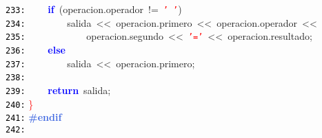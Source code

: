 \documentclass[a4paper,10pt]{scrartcl}
\begin{document}
{   \mbox{}\texttt{\textcolor{Black}{233:}} \ \ \ \ \textbf{\textcolor{Blue}{if}}\ \textcolor{BrickRed}{(}operacion\textcolor{BrickRed}{.}operador\ \textcolor{BrickRed}{!=}\ \texttt{\textcolor{Red}{'\ '}}\textcolor{BrickRed}{)} \\
   \mbox{}\texttt{\textcolor{Black}{234:}} \ \ \ \ \ \ \ \ salida\ \textcolor{BrickRed}{\textless{}\textless{}}\ operacion\textcolor{BrickRed}{.}primero\ \textcolor{BrickRed}{\textless{}\textless{}}\ operacion\textcolor{BrickRed}{.}operador\ \textcolor{BrickRed}{\textless{}\textless{}} \\
   \mbox{}\texttt{\textcolor{Black}{235:}} \ \ \ \ \ \ \ \ \ \ \ \ operacion\textcolor{BrickRed}{.}segundo\ \textcolor{BrickRed}{\textless{}\textless{}}\ \texttt{\textcolor{Red}{'='}}\ \textcolor{BrickRed}{\textless{}\textless{}}\ operacion\textcolor{BrickRed}{.}resultado\textcolor{BrickRed}{;} \\
   \mbox{}\texttt{\textcolor{Black}{236:}} \ \ \ \ \textbf{\textcolor{Blue}{else}}\  \\
   \mbox{}\texttt{\textcolor{Black}{237:}} \ \ \ \ \ \ \ \ salida\ \textcolor{BrickRed}{\textless{}\textless{}}\ operacion\textcolor{BrickRed}{.}primero\textcolor{BrickRed}{;} \\
   \mbox{}\texttt{\textcolor{Black}{238:}} \ \ \ \  \\
   \mbox{}\texttt{\textcolor{Black}{239:}} \ \ \ \ \textbf{\textcolor{Blue}{return}}\ salida\textcolor{BrickRed}{;} \\
   \mbox{}\texttt{\textcolor{Black}{240:}} \textcolor{Red}{\}} \\
   \mbox{}\texttt{\textcolor{Black}{241:}} \textbf{\textcolor{RoyalBlue}{\#endif}} \\
   \mbox{}\texttt{\textcolor{Black}{242:}} 
   }
   \normalsize
   
\end{document}

